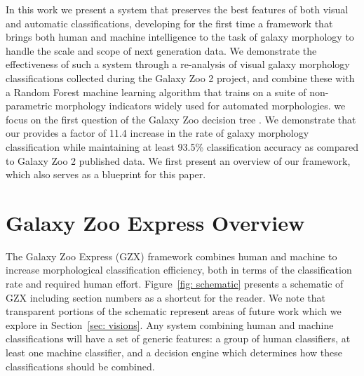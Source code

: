\documentclass[twocolumn,  trackchanges,]{aastex6}%
\begin{document}
 In this work we present a system that preserves the best features of both visual 
and automatic classifications, developing for the first time a framework that 
brings both human and machine intelligence to the task of galaxy morphology to 
handle the scale and scope of next generation data. We demonstrate the 
effectiveness of such a system through a re-analysis of visual galaxy morphology
 classifications collected during the Galaxy Zoo 2 project, and combine these with a 
Random Forest machine learning algorithm that trains on a suite of non-parametric
 morphology indicators widely used for automated morphologies. 
 we focus on the first question of the Galaxy Zoo 
decision tree . We demonstrate that our  
provides a factor of 11.4 increase in the rate of galaxy morphology classification
 while maintaining at least 93.5\% classification accuracy as compared to Galaxy Zoo 2 published data. 
We first present an overview of our framework, which also serves as a blueprint for this paper. 


\section{Galaxy Zoo Express Overview}

The Galaxy Zoo Express (GZX) framework combines human and machine to
 increase morphological classification efficiency, both in terms of the classification rate 
and required human effort. Figure~\ref{fig: schematic} presents a schematic of 
GZX including section numbers as a shortcut for the reader. We note that transparent 
portions  of the schematic represent areas of future work which we explore in 
Section~\ref{sec: visions}. Any system combining human and machine classifications 
will have a set of generic features: a group of human classifiers, at least one 
machine classifier, and a decision engine which determines how these 
classifications should be combined.
\end{document}
